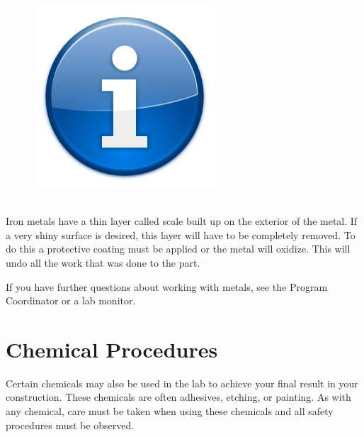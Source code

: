 \begin{framed}
\begin{figure}
\includegraphics[width=\linewidth]{images/info_icon.png}
\end{figure}
\ \\
Iron metals have a thin layer called scale built up on the exterior of the metal. If a very shiny surface is desired, this layer will have to be completely removed. To do this a protective coating must be applied or the metal will oxidize.  This will undo all the work that was done to the part.  
\end{framed}
If you have further questions about working with metals, see the Program Coordinator or a lab monitor.

\section{Chemical Procedures}
Certain chemicals may also be used in the lab to achieve your final result in your construction.  These chemicals are often adhesives, etching, or painting.  As with any chemical, care must be taken when using these chemicals and all safety procedures must be observed.

